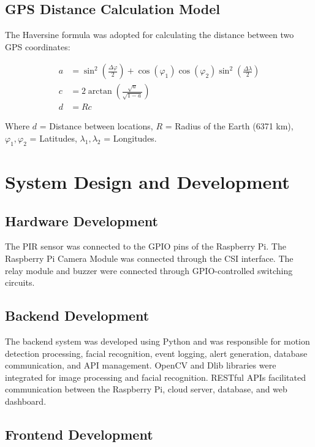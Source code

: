 \documentclass[12pt,a4paper,oneside]{report}
\begin{document}
\subsection{GPS Distance Calculation Model}

The Haversine formula was adopted for calculating the distance between two GPS coordinates:

\begin{align}
  a &= \sin^2\!\left(\frac{\Delta\varphi}{2}\right) + \cos(\varphi_1)\cos(\varphi_2)\sin^2\!\left(\frac{\Delta\lambda}{2}\right) \\
  c &= 2\arctan\!\left(\frac{\sqrt{a}}{\sqrt{1-a}}\right) \\
  d &= Rc
\end{align}

Where $d$ = Distance between locations, $R$ = Radius of the Earth (6371 km), $\varphi_1, \varphi_2$ = Latitudes, $\lambda_1, \lambda_2$ = Longitudes.

\section{System Design and Development}

\subsection{Hardware Development}

The PIR sensor was connected to the GPIO pins of the Raspberry Pi. The Raspberry Pi Camera Module was connected through the CSI interface. The relay module and buzzer were connected through GPIO-controlled switching circuits.

\subsection{Backend Development}

The backend system was developed using Python and was responsible for motion detection processing, facial recognition, event logging, alert generation, database communication, and API management. OpenCV and Dlib libraries were integrated for image processing and facial recognition. RESTful APIs facilitated communication between the Raspberry Pi, cloud server, database, and web dashboard.

\subsection{Frontend Development}
\end{document}
